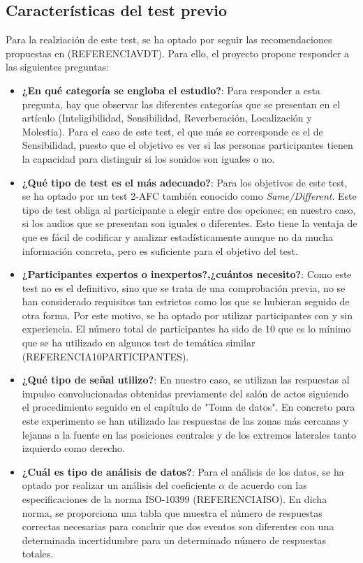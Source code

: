 \documentclass[11pt,a4paper,twoside]{book}
\begin{document}
            \subsection{Características del test previo}
                Para la realziación de este test, se ha optado por seguir las recomendaciones propuestas en (REFERENCIAVDT). Para ello, el proyecto propone responder a las siguientes preguntas:
                \begin{itemize}
                    \item \textbf{¿En qué categoría se engloba el estudio?}: Para responder a esta pregunta, hay que observar las diferentes categorías que se presentan en el artículo (Inteligibilidad, Sensibilidad, Reverberación, Localización y Molestia). Para el caso de este test, el que más se corresponde es el de Sensibilidad, puesto que el objetivo es ver si las personas participantes tienen la capacidad para distinguir si los sonidos son iguales o no.
                    \item \textbf{¿Qué tipo de test es el más adecuado?}: Para los objetivos de este test, se ha optado por un test 2-AFC también conocido como \textit{Same/Different}. Este tipo de test obliga al participante a elegir entre dos opciones; en nuestro caso, si los audios que se presentan son iguales o diferentes. Esto tiene la ventaja de que es fácil de codificar y analizar estadísticamente aunque no da mucha información concreta, pero es suficiente para el objetivo del test.
                    \item \textbf{¿Participantes expertos o inexpertos?,¿cuántos necesito?}: Como este test no es el definitivo, sino que se trata de una comprobación previa, no se han considerado requisitos tan estrictos como los que se hubieran seguido de otra forma. Por este motivo, se ha optado por utilizar participantes con y sin experiencia. El número total de participantes ha sido de 10 que es lo mínimo que se ha utilizado en algunos test de temática similar (REFERENCIA10PARTICIPANTES).
                    \item \textbf{¿Qué tipo de señal utilizo?}: En nuestro caso, se utilizan las respuestas al impulso convolucionadas obtenidas previamente del salón de actos siguiendo el procedimiento seguido en el capítulo de "Toma de datos". En concreto para este experimento se han utilizado las respuestas de las zonas más cercanas y lejanas a la fuente en las posiciones centrales y de los extremos laterales tanto izquierdo como derecho.
                    \item \textbf{¿Cuál es tipo de análisis de datos?}: Para el análisis de los datos, se ha optado por realizar un análisis del coeficiente $\alpha$ de acuerdo con las especificaciones de la norma ISO-10399 (REFERENCIAISO). En dicha norma, se proporciona una tabla que muestra el número de respuestas correctas necesarias para concluir que dos eventos son diferentes con una determinada incertidumbre para un determinado número de respuestas totales.
                \end{itemize}
                
\end{document}
